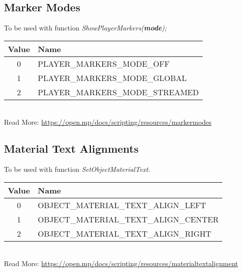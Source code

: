 \documentclass{article}
\begin{document}
\subsection{Marker Modes}
To be used with function \textit{ShowPlayerMarkers(\textbf{mode});}
\bigskip
\\\begin{tabular}{ |c|l| } 
\hline
Value & Name \\
\hline
0 & PLAYER\_MARKERS\_MODE\_OFF \\ 
1 & PLAYER\_MARKERS\_MODE\_GLOBAL \\ 
2 & PLAYER\_MARKERS\_MODE\_STREAMED \\
\hline
\end{tabular}
\bigskip
\\Read More: \url{https://open.mp/docs/scripting/resources/markermodes}


\newpage
\subsection{Material Text Alignments}
To be used with function \textit{SetObjectMaterialText}.
\bigskip
\\\begin{tabular}{ |c|l| }
\hline
Value & Name \\
\hline
0 & OBJECT\_MATERIAL\_TEXT\_ALIGN\_LEFT \\
1 & OBJECT\_MATERIAL\_TEXT\_ALIGN\_CENTER \\
2 & OBJECT\_MATERIAL\_TEXT\_ALIGN\_RIGHT \\
\hline
\end{tabular}
\bigskip
\\Read More: \url{https://open.mp/docs/scripting/resources/materialtextalignment}
\end{document}
